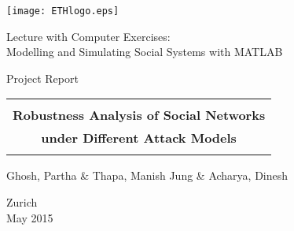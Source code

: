 
\thispagestyle{empty}

\begin{center}
\texttt{[image: ETHlogo.eps]}

\bigskip


\bigskip


\bigskip


\LARGE{ 	Lecture with Computer Exercises:\\ }
\LARGE{ Modelling and Simulating Social Systems with MATLAB\\}

\bigskip

\bigskip

\small{Project Report}\\

\bigskip

\bigskip

\bigskip

\bigskip


\begin{tabular}{|c|}
\hline
\\
\textbf{\LARGE{Robustness Analysis of Social Networks}}\\
\textbf{\LARGE{under Different Attack Models}}\\
\\
\hline
\end{tabular}
\bigskip

\bigskip

\bigskip

\LARGE{Ghosh, Partha \& Thapa, Manish Jung \& Acharya, Dinesh}



\bigskip

\bigskip

\bigskip

\bigskip

\bigskip

\bigskip

\bigskip

\bigskip

Zurich\\
May 2015\\

\end{center}



